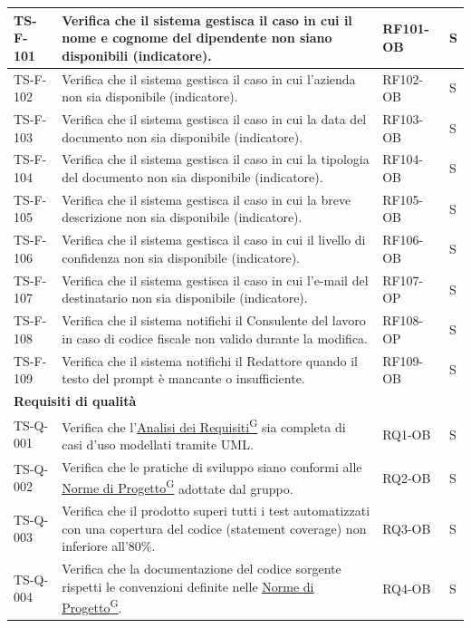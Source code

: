 \documentclass[a4paper,12pt]{article}
\providecommand{\glslink}[2]{\href{https://alittlebyte-19.github.io/Documentazione/glossario.html\#gls-#1}{\underline{#2}\textsuperscript{\scriptsize G}}}
\begin{document}
\begin{longtable}{|p{2.2cm}|p{9.5cm}|p{2.3cm}|p{1.5cm}|}
    \hline
    TS-F-101 & Verifica che il sistema gestisca il caso in cui il nome e cognome del dipendente non siano disponibili (indicatore). & RF101-OB & S \\
    \hline
    TS-F-102 & Verifica che il sistema gestisca il caso in cui l'azienda non sia disponibile (indicatore). & RF102-OB & S \\
    \hline
    TS-F-103 & Verifica che il sistema gestisca il caso in cui la data del documento non sia disponibile (indicatore). & RF103-OB & S \\
    \hline
    TS-F-104 & Verifica che il sistema gestisca il caso in cui la tipologia del documento non sia disponibile (indicatore). & RF104-OB & S \\
    \hline
    TS-F-105 & Verifica che il sistema gestisca il caso in cui la breve descrizione non sia disponibile (indicatore). & RF105-OB & S \\
    \hline
    TS-F-106 & Verifica che il sistema gestisca il caso in cui il livello di confidenza non sia disponibile (indicatore). & RF106-OB & S \\
    \hline
    TS-F-107 & Verifica che il sistema gestisca il caso in cui l'e-mail del destinatario non sia disponibile (indicatore). & RF107-OP & S \\
    \hline
    TS-F-108 & Verifica che il sistema notifichi il Consulente del lavoro in caso di codice fiscale non valido durante la modifica. & RF108-OP & S \\
    \hline
    TS-F-109 & Verifica che il sistema notifichi il Redattore quando il testo del prompt è mancante o insufficiente. & RF109-OB & S \\
    \hline
   \multicolumn{4}{|l|}{\cellcolor{gray!12}\textbf{Requisiti di qualità}} \\
    \hline
    TS-Q-001 & Verifica che l'\glslink{analisi-dei-requisiti-adr}{Analisi dei Requisiti} sia completa di casi d'uso modellati tramite UML. & RQ1-OB & S \\
    \hline
    TS-Q-002 & Verifica che le pratiche di sviluppo siano conformi alle \glslink{norme-di-progetto}{Norme di Progetto} adottate dal gruppo. & RQ2-OB & S \\
    \hline
    TS-Q-003 & Verifica che il prodotto superi tutti i test automatizzati con una copertura del codice (statement coverage) non inferiore all'80\%. & RQ3-OB & S \\
    \hline
    TS-Q-004 & Verifica che la documentazione del codice sorgente rispetti le convenzioni definite nelle \glslink{norme-di-progetto}{Norme di Progetto}. & RQ4-OB & S \\

\end{longtable}
\end{document}
